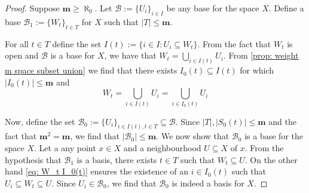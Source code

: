 \begin{proof}
  Suppose \(\mathbf m \geq \aleph_0\). Let \(\mathcal B := \{U_i\}_{i \in I}\)
  be any base for the space \(X\). Define a base \(\mathcal B_1 := \{W_t\}_{t
  \in T}\) for \(X\) such that \(|T| \leq \mathbf m\).

  For all \(t \in T\) define the set \(I(t) := \{i \in I : U_i \subseteq
  W_t\}\). From the fact that \(W_t\) is open and \(\mathcal B\) is a base for
  \(X\), we have that \(W_t = \bigcup_{i \in  I(t)} U_i\).  From \cref{prop:
  weight m space subset union} we find that there exists \(I_0(t) \subseteq
  I(t)\) for which \(|I_0(t)| \leq \mathbf m\) and
  \begin{equation}\label{eq: W_t I_0(t)}
    W_t = \bigcup_{i \in  I(t)} U_i = \bigcup_{i \in  I_0(t)} U_i
  \end{equation}

  Now, define the set \(\mathcal B_0 := \{U_i\}_{i \in I(t), t \in T} \subseteq
  \mathcal B\). Since \(|T|, |S_0(t)| \leq \mathbf m\) and the fact that
  \(\mathbf m^2 = \mathbf m\), we find that \(|\mathcal B_0| \leq \mathbf m\).
  We now show that \(\mathcal B_0\) is a base for the space \(X\). Let a any
  point \(x \in X\) and a neighbourhood \(U \subseteq X\) of \(x\). From the
  hypothesis that \(\mathcal B_1\) is a basis, there exists \(t \in T\) such
  that \(W_t \subseteq U\). On the other hand \cref{eq: W_t I_0(t)} ensures the
  existence of an \(i \in I_0(t)\) such that \(U_i \subseteq W_t \subseteq U\).
  Since \(U_i \in \mathcal B_0\), we find that \(\mathcal B_0\) is indeed a
  basis for \(X\).
\end{proof}

